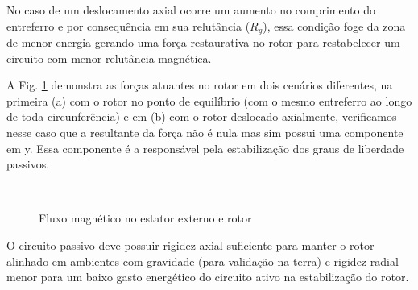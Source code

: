 No caso de um deslocamento axial ocorre um aumento no comprimento do entreferro e por consequência em sua relutância ($R_{g}$), essa condição foge da zona de menor energia gerando uma força restaurativa no rotor para restabelecer um circuito com menor relutância magnética.

A Fig. \ref{fig:modelo:circuito:passivo:forcas} demonstra as forças atuantes no rotor em dois cenários diferentes, na primeira (a) com o rotor no ponto de equilíbrio (com o mesmo entreferro ao longo de toda circunferência) e em (b) com o rotor deslocado axialmente, verificamos nesse caso que a resultante da força não é nula mas sim possui uma componente em y. Essa componente é a responsável pela estabilização dos graus de liberdade passivos.

\begin{figure}[th!]
\centering
{} \\
\caption{Fluxo magnético no estator externo e rotor}
\label{fig:modelo:circuito:passivo:forcas}
\end{figure}

O circuito passivo deve possuir rigidez axial suficiente para manter o rotor alinhado em ambientes com gravidade (para validação na terra) e rigidez radial menor para um baixo gasto energético do circuito ativo na estabilização do rotor.


